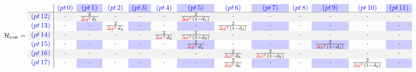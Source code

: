 \documentclass[10pt,a4paper, landscape]{article}
\newcommand{\pnormal}[1]{\textcolor{blue}{(pt\,#1)}}
\newcommand{\pgray}[1]{\rowcolor{gray!10}\textcolor{blue}{(pt\,#1)}}
\newcommand{\coeff}[3]{\frac{2}{\textcolor{red}{#1}\,#2\,#3}}
\newcommand{\dx}{\Delta x}
\newcommand{\dy}{\Delta y}
\begin{document}
\begin{equation*}
\mathcal{H}_{\text{row}} = 
\begin{array}{c|c>{\columncolor{blue!20}}cc>{\columncolor{blue!20}}cc>{\columncolor{blue!20}}cc>{\columncolor{blue!20}}cc>{\columncolor{blue!20}}cc>{\columncolor{blue!20}}c}
& \pnormal{0} & \pnormal{1} & \pnormal{2} & \pnormal{3} & \pnormal{4} & \pnormal{5} & \pnormal{6} & \pnormal{7} & \pnormal{8} & \pnormal{9} & \pnormal{10} & \pnormal{11} \\
\hline
\pgray{12} & \cdot & \coeff{\dy^2}{d_1}{} & \cdot & \cdot & \cdot & \coeff{\dy^2}{(1-d_1)}{} & \cdot & \cdot & \cdot & \cdot & \cdot & \cdot\\
\pnormal{13} & \cdot & \cdot & \coeff{\dy^2}{d_2}{} & \cdot & \cdot & \cdot & \coeff{\dy^2}{(1-d_2)}{} & \cdot & \cdot & \cdot & \cdot & \cdot\\
\pgray{14} & \cdot & \cdot & \cdot & \cdot & \coeff{\dx^2}{d_3}{} & \coeff{\dx^2}{(1-d_3)}{} & \cdot & \cdot & \cdot & \cdot & \cdot & \cdot\\
\pnormal{15} & \cdot & \cdot & \cdot & \cdot & \cdot & \coeff{\dy^2}{d_4}{} & \cdot & \cdot & \cdot & \coeff{\dy^2}{(1-d_4)}{} & \cdot & \cdot\\
\pgray{16} & \cdot & \cdot & \cdot & \cdot & \cdot & \cdot & \coeff{\dx^2}{d_5}{} & \coeff{\dx^2}{(1-d_5)}{} & \cdot & \cdot & \cdot & \cdot\\
\pnormal{17} & \cdot & \cdot & \cdot & \cdot & \cdot & \cdot & \coeff{\dy^2}{d_6}{} & \cdot & \cdot & \cdot & \coeff{\dy^2}{(1-d_6)}{} & \cdot\\
\end{array}
\end{equation*}
\vspace{2cm}
\end{document}
